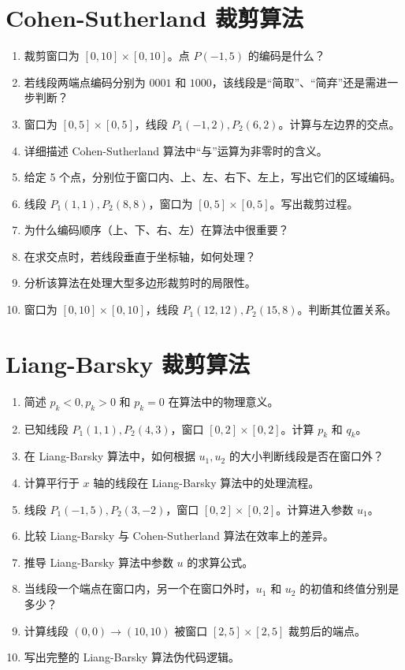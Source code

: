 \documentclass[UTF8]{ctexart}
\begin{document}
\section{Cohen-Sutherland 裁剪算法}
\begin{enumerate}
    \item 裁剪窗口为 $[0,10] \times [0,10]$。点 $P( -1, 5)$ 的编码是什么？
    \item 若线段两端点编码分别为 $0001$ 和 $1000$，该线段是“简取”、“简弃”还是需进一步判断？
    \item 窗口为 $[0,5] \times [0,5]$，线段 $P_1(-1,2), P_2(6,2)$。计算与左边界的交点。
    \item 详细描述 Cohen-Sutherland 算法中“与”运算为非零时的含义。
    \item 给定 5 个点，分别位于窗口内、上、左、右下、左上，写出它们的区域编码。
    \item 线段 $P_1(1,1), P_2(8,8)$，窗口为 $[0,5] \times [0,5]$。写出裁剪过程。
    \item 为什么编码顺序（上、下、右、左）在算法中很重要？
    \item 在求交点时，若线段垂直于坐标轴，如何处理？
    \item 分析该算法在处理大型多边形裁剪时的局限性。
    \item 窗口为 $[0,10] \times [0,10]$，线段 $P_1(12,12), P_2(15,8)$。判断其位置关系。
\end{enumerate}

\section{Liang-Barsky 裁剪算法}
\begin{enumerate}
    \item 简述 $p_k < 0, p_k > 0$ 和 $p_k = 0$ 在算法中的物理意义。
    \item 已知线段 $P_1(1,1), P_2(4,3)$，窗口 $[0,2] \times [0,2]$。计算 $p_k$ 和 $q_k$。
    \item 在 Liang-Barsky 算法中，如何根据 $u_1, u_2$ 的大小判断线段是否在窗口外？
    \item 计算平行于 $x$ 轴的线段在 Liang-Barsky 算法中的处理流程。
    \item 线段 $P_1(-1, 5), P_2(3, -2)$，窗口 $[0,2] \times [0,2]$。计算进入参数 $u_1$。
    \item 比较 Liang-Barsky 与 Cohen-Sutherland 算法在效率上的差异。
    \item 推导 Liang-Barsky 算法中参数 $u$ 的求算公式。
    \item 当线段一个端点在窗口内，另一个在窗口外时，$u_1$ 和 $u_2$ 的初值和终值分别是多少？
    \item 计算线段 $(0,0) \to (10,10)$ 被窗口 $[2,5] \times [2,5]$ 裁剪后的端点。
    \item 写出完整的 Liang-Barsky 算法伪代码逻辑。
\end{enumerate}
\end{document}
